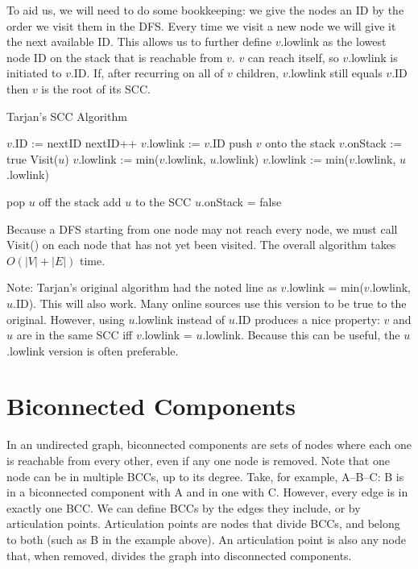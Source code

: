 \documentclass{article}
\begin{document}
To aid us, we will need to do some bookkeeping: we give the nodes an ID by the order we visit them in the DFS. Every time we visit a new node we will give it the next available ID. This allows us to further define $v$.lowlink as the lowest node ID on the stack that is reachable from $v$. $v$ can reach itself, so $v$.lowlink is initiated to $v$.ID. If, after recurring on all of $v$ children, $v$.lowlink still equals $v$.ID then $v$ is the root of its SCC.

\begin{algorithm}[H]
\caption{Tarjan's SCC Algorithm}
\begin{algorithmic}
  \State $v$.ID := nextID
  \State nextID++
  \State $v$.lowlink := $v$.ID
  \State push $v$ onto the stack
  \State $v$.onStack := true
      \State Visit($u$)
      \State $v$.lowlink := min($v$.lowlink, $u$.lowlink)
      \State $v$.lowlink := min($v$.lowlink, $u$.lowlink)
    \EndIf
  \EndFor
  
      \State pop $u$ off the stack
      \State add $u$ to the SCC
      \State $u$.onStack = false
    \EndWhile
  \EndIf
\EndFunction
\end{algorithmic}
\end{algorithm}

Because a DFS starting from one node may not reach every node, we must call Visit() on each node that has not yet been visited. The overall algorithm takes $O(|V| + |E|)$ time.

Note: Tarjan's original algorithm had the noted line as $v$.lowlink = min($v$.lowlink, $u$.ID). This will also work. Many online sources use this version to be true to the original. However, using $u$.lowlink instead of $u$.ID produces a nice property: $v$ and $u$ are in the same SCC iff $v$.lowlink = $u$.lowlink. Because this can be useful, the $u$.lowlink version is often preferable.

\newpage
\section{Biconnected Components}

In an undirected graph, biconnected components are sets of nodes where each one is reachable from every other, even if any one node is removed. Note that one node can be in multiple BCCs, up to its degree. Take, for example, A--B--C: B is in a biconnected component with A and in one with C. However, every edge is in exactly one BCC. We can define BCCs by the edges they include, or by articulation points. Articulation points are nodes that divide BCCs, and belong to both (such as B in the example above). An articulation point is also any node that, when removed, divides the graph into disconnected components.
\end{document}
